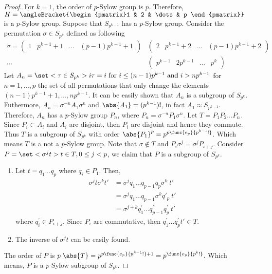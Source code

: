 \begin{proof}
    For \(k = 1\), the order of \(p\)-Sylow group is \(p\). Therefore, \(H = \angleBracket{\begin{pmatrix}1 & 2 & \dots & p \end{pmatrix}}\) is a \(p\)-Sylow group.
    Suppose that \(S_{p^{k-1}}\) has a \(p\)-Sylow group. Consider the permutation \(\sigma \in S_{p^k}\) defined as following 
    \begin{align*}
        \sigma = \begin{pmatrix}
            1 & p^{k-1} + 1 & \dots & (p-1)p^{k-1} + 1
        \end{pmatrix} & \begin{pmatrix}
            2 & p^{k-1} + 2 & \dots & (p-1)p^{k-1} + 2
        \end{pmatrix} \\
        \dots& \begin{pmatrix}
            p^{k-1} & 2 p^{k-1} & \dots & p^k
        \end{pmatrix}
    \end{align*}
    Let \(A_n = \set<\tau \in S_{p^k}>{i \tau = i \text{ for } i \leq (n-1)p^{k-1}  \text{ and } i > np^{k-1}}\) for \(n = 1, \dots,p \) the set of all permutations that only change the elements \((n-1)p^{k-1} + 1, \dots,np^{k-1}\). It can be easily shown that \(A_n\) is a subgroup of \(S_{p^k}\). Futhermore, \(A_n = \sigma^{-n} A_1 \sigma^{n}\) and \(\abs{A_1} = (p^{k-1})!\), in fact \(A_1 \approx S_{p^{k-1}}\). Therefore, \(A_n\) has a \(p\)-Sylow group \(P_n\), where \(P_n = \sigma^{-n} P_1 \sigma^{n}\). Let \(T = P_1 P_2 \dots P_n\). Since \(P_i \subset A_i\) and \(A_i\) are disjoint, then \(P_i\) are disjoint and hence they commute. Thus \(T\) is a subgroup of \(S_{p^k}\) with order \(\abs{P_1}^p = p^{p\func{e_p}{p^{k-1}!}}\). Which means \(T\) is a not a \(p\)-Sylow group. Note that \(\sigma \notin T\) and \(P_{i}\sigma^j = \sigma^j P_{i+j}\). Consider \(P = \set<\sigma^j t>{t \in T, 0 \leq j < p}\), we claim that \(P\) is a subgroup of \(S_{p^k}\). 
    \begin{enumerate}
        \item Let \(t = q_1 \dots q_p\) where \(q_i \in P_1\). Then, 
        \begin{align*}
            \sigma^{j} t \sigma^{k} t' &= \sigma^{j}  q_1 \dots q_{p-1} q_p \sigma^{k}\ t'\\
            &= \sigma^{j}  q_1 \dots q_{p-1} \sigma^{k} q'_p\  t'\\
            &= \sigma^{j+k}  q_1^{'} \dots q_{p-1}^{'}  q_p^{'} \ t'
        \end{align*}
        where \(q_i^{'} \in P_{i + j}\). Since \(P_i\) are commutative, then \(  q_1^{'} \dots  q_p^{'}  t' \in T\).
        \item The inverse of \(\sigma^j t\) can be easily found.
    \end{enumerate}
    The order of \(P\) is \(p\; \abs{T} = p^{p\func{e_p}{p^{k-1}!} + 1} = p^{\func{e_p}{p^k!}}\). Which means, \(P\) is a \(p\)-Sylow subgroup of \(S_{p^k}\).
\end{proof}

